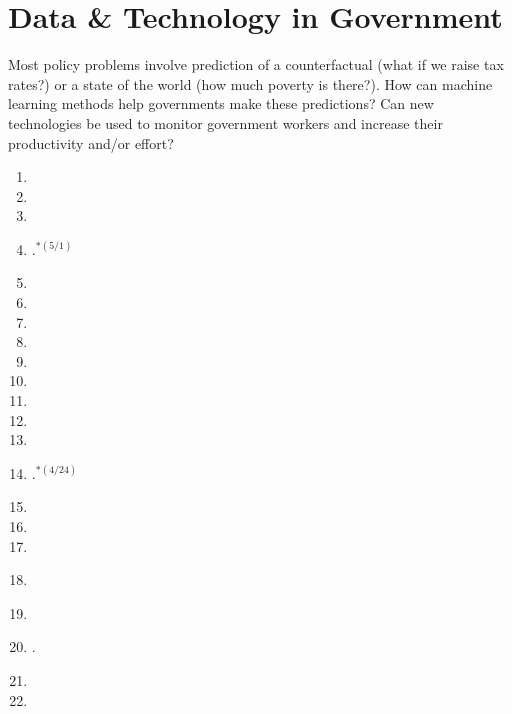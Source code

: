 \documentclass[11pt]{article}
\begin{document}
\section{Data \& Technology in Government}
Most policy problems involve prediction of a counterfactual (what if we raise tax rates?) or a state of the world (how much poverty is there?). How can machine learning methods help governments make these predictions? Can new technologies be used to monitor government workers and increase their productivity and/or effort?

\begin{enumerate}
\item {}
\item {}
\item {}
\item {}.$^{*(5/1)}$
\item {}
\item {}
\item {}
\item {}
\item {}
\item {}
\item {}
\item {}
\item {}
\item {}.$^{*(4/24)}$
\item {}
\item {}
\item {}
\item \textbf{}
\item \textbf{}
\item {}.
\item {}
\item {}
\end{enumerate}


\end{document}
